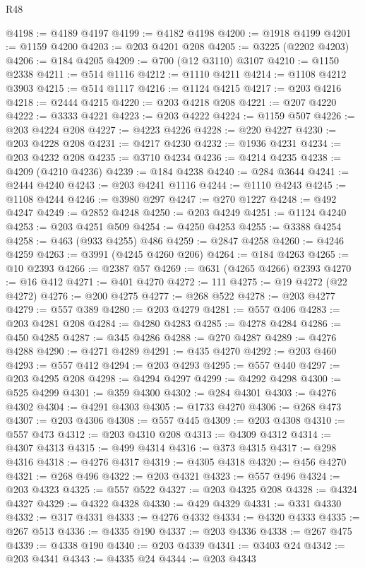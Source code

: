 \begin{lexlean}{R48}
\begin{coremodule}
@4198 := @4189 @4197
@4199 := @4182 @4198
@4200 := @1918 @4199
@4201 := @1159 @4200
@4203 := @203 @4201 @208
@4205 := @3225 (@2202 @4203)
@4206 := @184 @4205
@4209 := @700 (@12 @3110) @3107
@4210 := @1150 @2338
@4211 := @514 @1116
@4212 := @1110 @4211
@4214 := @1108 @4212 @3903
@4215 := @514 @1117
@4216 := @1124 @4215
@4217 := @203 @4216
@4218 := @2444 @4215
@4220 := @203 @4218 @208
@4221 := @207 @4220
@4222 := @3333 @4221
@4223 := @203 @4222
@4224 := @1159 @507
@4226 := @203 @4224 @208
@4227 := @4223 @4226
@4228 := @220 @4227
@4230 := @203 @4228 @208
@4231 := @4217 @4230
@4232 := @1936 @4231
@4234 := @203 @4232 @208
@4235 := @3710 @4234
@4236 := @4214 @4235
@4238 := @4209 (@4210 @4236)
@4239 := @184 @4238
@4240 := @284 @3644
@4241 := @2444 @4240
@4243 := @203 @4241 @1116
@4244 := @1110 @4243
@4245 := @1108 @4244
@4246 := @3980 @297
@4247 := @270 @1227
@4248 := @492 @4247
@4249 := @2852 @4248
@4250 := @203 @4249
@4251 := @1124 @4240
@4253 := @203 @4251 @509
@4254 := @4250 @4253
@4255 := @3388 @4254
@4258 := @463 (@933 @4255) @486
@4259 := @2847 @4258
@4260 := @4246 @4259
@4263 := @3991 (@4245 @4260 @206)
@4264 := @184 @4263
@4265 := @10 @2393
@4266 := @2387 @57
@4269 := @631 (@4265 @4266) @2393
@4270 := @16 @412
@4271 := @401 @4270
@4272 := 111
@4275 := @19 @4272 (@22 @4272)
@4276 := @200 @4275
@4277 := @268 @522
@4278 := @203 @4277
@4279 := @557 @389
@4280 := @203 @4279
@4281 := @557 @406
@4283 := @203 @4281 @208
@4284 := @4280 @4283
@4285 := @4278 @4284
@4286 := @450 @4285
@4287 := @345 @4286
@4288 := @270 @4287
@4289 := @4276 @4288
@4290 := @4271 @4289
@4291 := @435 @4270
@4292 := @203 @460
@4293 := @557 @412
@4294 := @203 @4293
@4295 := @557 @440
@4297 := @203 @4295 @208
@4298 := @4294 @4297
@4299 := @4292 @4298
@4300 := @525 @4299
@4301 := @359 @4300
@4302 := @284 @4301
@4303 := @4276 @4302
@4304 := @4291 @4303
@4305 := @1733 @4270
@4306 := @268 @473
@4307 := @203 @4306
@4308 := @557 @445
@4309 := @203 @4308
@4310 := @557 @473
@4312 := @203 @4310 @208
@4313 := @4309 @4312
@4314 := @4307 @4313
@4315 := @499 @4314
@4316 := @373 @4315
@4317 := @298 @4316
@4318 := @4276 @4317
@4319 := @4305 @4318
@4320 := @456 @4270
@4321 := @268 @496
@4322 := @203 @4321
@4323 := @557 @496
@4324 := @203 @4323
@4325 := @557 @522
@4327 := @203 @4325 @208
@4328 := @4324 @4327
@4329 := @4322 @4328
@4330 := @429 @4329
@4331 := @331 @4330
@4332 := @317 @4331
@4333 := @4276 @4332
@4334 := @4320 @4333
@4335 := @267 @513
@4336 := @4335 @190
@4337 := @203 @4336
@4338 := @267 @475
@4339 := @4338 @190
@4340 := @203 @4339
@4341 := @3403 @24
@4342 := @203 @4341
@4343 := @4335 @24
@4344 := @203 @4343

\end{coremodule}
\end{lexlean}
